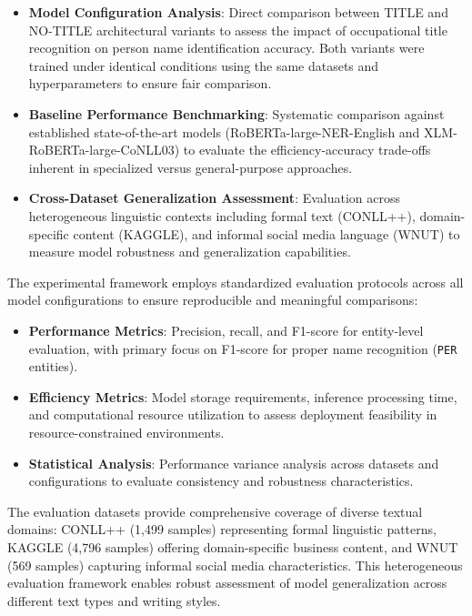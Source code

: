 \documentclass[a4paper]{usiinfbachelorproject}
\begin{document}
\begin{itemize}
  \item \textbf{Model Configuration Analysis}: Direct comparison between TITLE and NO-TITLE architectural variants to assess the impact of occupational title recognition on person name identification accuracy. Both variants were trained under identical conditions using the same datasets and hyperparameters to ensure fair comparison.
  \item \textbf{Baseline Performance Benchmarking}: Systematic comparison against established state-of-the-art models (RoBERTa-large-NER-English and XLM-RoBERTa-large-CoNLL03) to evaluate the efficiency-accuracy trade-offs inherent in specialized versus general-purpose approaches.
  \item \textbf{Cross-Dataset Generalization Assessment}: Evaluation across heterogeneous linguistic contexts including formal text (CONLL++), domain-specific content (KAGGLE), and informal social media language (WNUT) to measure model robustness and generalization capabilities.

\end{itemize}

The experimental framework employs standardized evaluation protocols across all model configurations to ensure reproducible and meaningful comparisons:

\begin{itemize}
  \item \textbf{Performance Metrics}: Precision, recall, and F1-score for entity-level evaluation, with primary focus on F1-score for proper name recognition (\texttt{PER} entities).
  \item \textbf{Efficiency Metrics}: Model storage requirements, inference processing time, and computational resource utilization to assess deployment feasibility in resource-constrained environments.
  \item \textbf{Statistical Analysis}: Performance variance analysis across datasets and configurations to evaluate consistency and robustness characteristics.
\end{itemize}

The evaluation datasets provide comprehensive coverage of diverse textual domains: CONLL++ (1,499 samples) representing formal linguistic patterns, KAGGLE (4,796 samples) offering domain-specific business content, and WNUT (569 samples) capturing informal social media characteristics. This heterogeneous evaluation framework enables robust assessment of model generalization across different text types and writing styles.
\end{document}
